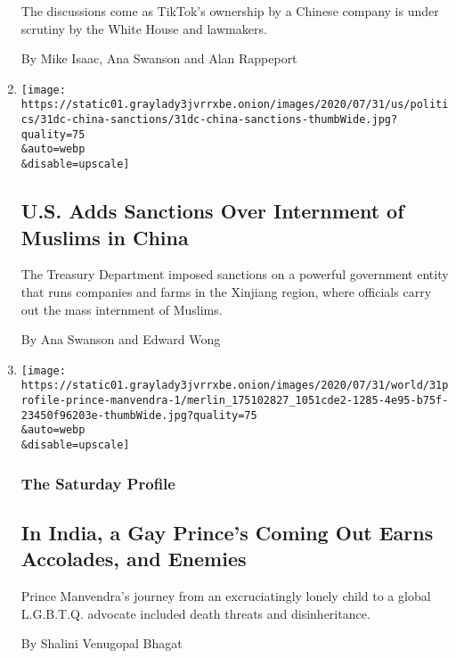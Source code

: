 \begin{enumerate}
  The discussions come as TikTok's ownership by a Chinese company is
  under scrutiny by the White House and lawmakers.

  By Mike Isaac, Ana Swanson and Alan Rappeport
\item
  \href{/2020/07/31/us/politics/sanctions-china-xinjiang-uighurs.html}{}

  \texttt{[image: https://static01.graylady3jvrrxbe.onion/images/2020/07/31/us/politics/31dc-china-sanctions/31dc-china-sanctions-thumbWide.jpg?quality=75\\\&auto=webp\\\&disable=upscale]}

  \hypertarget{us-adds-sanctions-over-internment-of-muslims-in-china}{%
  \subsection{U.S. Adds Sanctions Over Internment of Muslims in
  China}\label{us-adds-sanctions-over-internment-of-muslims-in-china}}

  The Treasury Department imposed sanctions on a powerful government
  entity that runs companies and farms in the Xinjiang region, where
  officials carry out the mass internment of Muslims.

  By Ana Swanson and Edward Wong
\item
  \href{/2020/07/31/world/asia/india-prince-manvendra-gay-rights.html}{}

  \texttt{[image: https://static01.graylady3jvrrxbe.onion/images/2020/07/31/world/31profile-prince-manvendra-1/merlin\_175102827\_1051cde2-1285-4e95-b75f-23450f96203e-thumbWide.jpg?quality=75\\\&auto=webp\\\&disable=upscale]}

  \hypertarget{the-saturday-profile}{%
  \subsubsection{The Saturday Profile}\label{the-saturday-profile}}

  \hypertarget{in-india-a-gay-princes-coming-out-earns-accolades-and-enemies}{%
  \subsection{In India, a Gay Prince's Coming Out Earns Accolades, and
  Enemies}\label{in-india-a-gay-princes-coming-out-earns-accolades-and-enemies}}

  Prince Manvendra's journey from an excruciatingly lonely child to a
  global L.G.B.T.Q. advocate included death threats and disinheritance.

  By Shalini Venugopal Bhagat
\end{enumerate}

